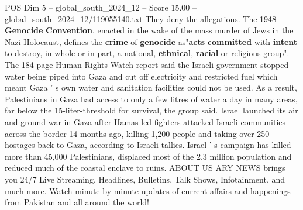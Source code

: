 \begin{textsample}{POS Dim 5 – global\_south\_2024\_12 – Score 15.00 – global\_south\_2024\_12/119055140.txt}
They deny the allegations.
The 1948 \textbf{Genocide} \textbf{Convention}, enacted in the wake of the mass murder of Jews in the Nazi Holocaust, defines the \textbf{crime} of \textbf{genocide} as"\textbf{acts} \textbf{committed} with \textbf{intent} to destroy, in whole or in part, a national, \textbf{ethnical}, \textbf{racial} or religious group".
The 184-page Human Rights Watch report said the Israeli government stopped water being piped into Gaza and cut off electricity and restricted fuel which meant Gaza ' s own water and sanitation facilities could not be used.
As a result, Palestinians in Gaza had access to only a few litres of water a day in many areas, far below the 15-liter-threshold for survival, the group said.
Israel launched its air and ground war in Gaza after Hamas-led fighters attacked Israeli communities across the border 14 months ago, killing 1,200 people and taking over 250 hostages back to Gaza, according to Israeli tallies.
Israel ' s campaign has killed more than 45,000 Palestinians, displaced most of the 2.3 million population and reduced much of the coastal enclave to ruins.
ABOUT US ARY NEWS brings you 24/7 Live Streaming, Headlines, Bulletins, Talk Shows, Infotainment, and much more.
Watch minute-by-minute updates of current affairs and happenings from Pakistan and all around the world!

\end{textsample}
